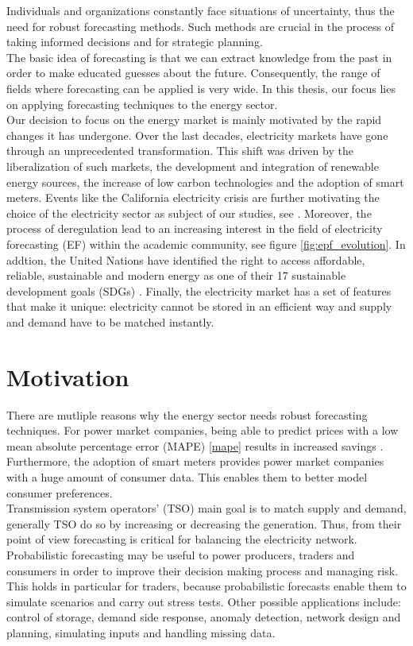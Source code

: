 Individuals and organizations constantly face situations of uncertainty, thus the need for robust forecasting methods. Such methods are crucial in the process of taking informed decisions and for strategic planning.
\\
The basic idea of forecasting is that we can extract knowledge from the past in order to make educated guesses about the future. Consequently, the range of fields where forecasting can be applied is very wide.
In this thesis, our focus lies on applying forecasting techniques to the energy sector. 
\\
Our decision to focus on the energy market is mainly motivated by the rapid changes it has undergone. %
Over the last decades, electricity markets have gone through an unprecedented transformation. This shift was driven by the liberalization of such markets, the development and integration of renewable energy sources, the  increase of low carbon technologies and the adoption of smart meters. Events like the California electricity crisis are further motivating the choice of the electricity sector as subject of our studies, see \cite{california}.
Moreover, the process of deregulation lead to an increasing interest in the field of electricity forecasting (EF) within the academic community, see figure \ref{fig:epf_evolution}.
In addtion, the United Nations have identified the right to access affordable, reliable, sustainable and modern energy as one of their 17 sustainable development goals (SDGs) .
Finally, the electricity market has a set of features that make it unique: electricity cannot be stored in an efficient way and supply and demand have to be matched instantly.
\\
\section{Motivation}
There are mutliple reasons why the energy sector needs robust forecasting techniques.
For power market companies, being able to predict prices with a low mean absolute percentage error (MAPE) \ref{mape} results in increased savings \cite{savings}. Furthermore, the adoption of smart meters provides power market companies with a huge amount of consumer data. This enables them to better model consumer preferences.
\\
Transmission system operators' (TSO) main goal is to match supply and demand, generally TSO do so by increasing or decreasing the generation. Thus, from their point of view forecasting is critical for balancing the electricity network.
Probabilistic forecasting may be useful to power producers, traders and consumers in order to improve their decision making process and managing risk. This holds in particular for traders, because probabilistic forecasts enable them to simulate scenarios and carry out stress tests.
Other possible applications include: control of storage, demand side response, anomaly detection, network design and planning, simulating inputs and handling missing data.
\\
